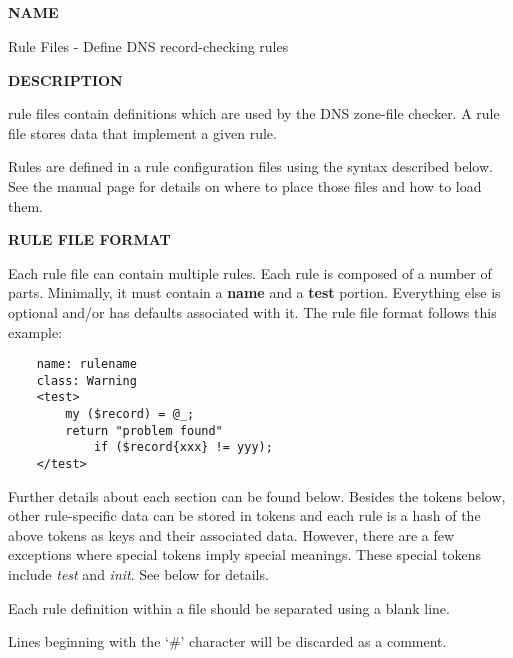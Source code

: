 \clearpage

\subsection{}

{\bf NAME}

 Rule Files - Define  DNS record-checking rules

{\bf DESCRIPTION}

 rule files contain definitions which are used by the 
DNS zone-file checker.  A rule file stores data that implement a given rule.

Rules are defined in a  rule configuration files using the syntax
described below.  See the  manual page for details on where to
place those files and how to load them.

{\bf RULE FILE FORMAT}

Each rule file can contain multiple rules.  Each rule is composed of a
number of parts.  Minimally, it must contain a {\bf name} and a {\bf test}
portion.  Everything else is optional and/or has defaults associated
with it.  The rule file format follows this example:

\begin{verbatim}
    name: rulename
    class: Warning
    <test>
        my ($record) = @_;
        return "problem found"
            if ($record{xxx} != yyy);
    </test>
\end{verbatim}

Further details about each section can be found below.  Besides the
tokens below, other rule-specific data can be stored in tokens
and each rule is a hash of the above tokens as keys and their
associated data.  However, there are a few exceptions where special
tokens imply special meanings.  These special tokens include {\it test}
and {\it init}.  See below for details.

Each rule definition within a file should be separated using a blank line.

Lines beginning with the `\#' character will be discarded as a comment.


